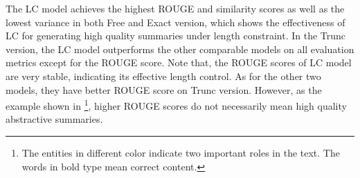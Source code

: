 The LC model achieves the highest ROUGE and similarity scores
as well as the lowest variance
in both Free and Exact version,
which shows the effectiveness of LC for generating 
high quality summaries under length constraint. 
In the Trunc version, the LC model outperforms the other 
comparable models on all evaluation metrics
except for the ROUGE score.
Note that, the ROUGE scores of LC model are
very stable, indicating its effective length control.
As for the other two models, 
they have better ROUGE score on Trunc version. 
However, as the example shown in 
\footnote{The entities in different color 
indicate two important roles in the text. The words in bold type mean correct 
content.}, higher ROUGE scores do not necessarily mean 
high quality abstractive summaries. 

